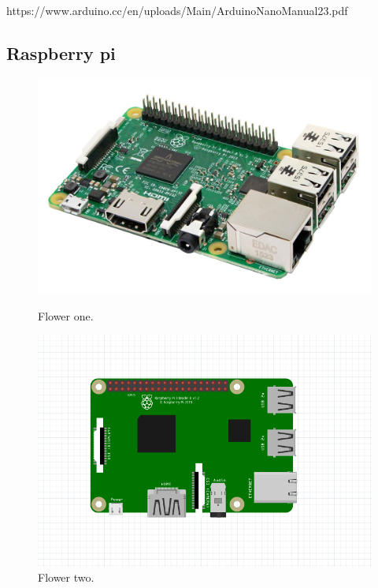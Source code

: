 https://www.arduino.cc/en/uploads/Main/ArduinoNanoManual23.pdf


\newpage

\subsection{Raspberry pi }


\begin{figure}[h]
	\centering
	\begin{minipage}[b]{0.4\textwidth}
		\includegraphics[width=\textwidth]{img/hardware/rasp3-img.jpg}
		\caption{Flower one.}
	\end{minipage}
	\hfill
	\begin{minipage}[b]{0.4\textwidth}
		\includegraphics[width=\textwidth]{img/hardware/rasp-esquema.PNG}
		\caption{Flower two.}
	\end{minipage}
\end{figure}


